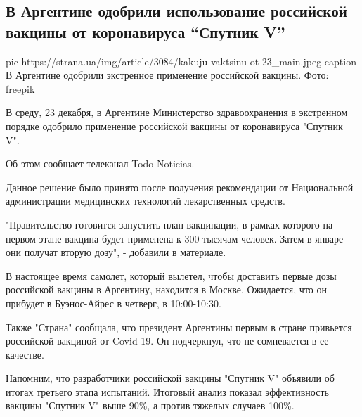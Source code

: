  
 
 
 
 
 
\subsection{В Аргентине одобрили использование российской вакцины от коронавируса \enquote{Спутник V}}
\label{sec:23_12_2020.news.ua.strana.1.argentina_sputnik_v}


\ifcmt
  pic https://strana.ua/img/article/3084/kakuju-vaktsinu-ot-23_main.jpeg
	caption В Аргентине одобрили экстренное применение российской вакцины. Фото: freepik 
\fi

В среду, 23 декабря, в Аргентине Министерство здравоохранения в экстренном
порядке одобрило применение российской вакцины от коронавируса "Спутник V".

Об этом сообщает телеканал Todo Noticias.

Данное решение было принято после получения рекомендации от Национальной
администрации медицинских технологий лекарственных средств.

"Правительство готовится запустить план вакцинации, в рамках которого на первом
этапе вакцина будет применена к 300 тысячам человек. Затем в январе они получат
вторую дозу", - добавили в материале.

В настоящее время самолет, который вылетел, чтобы доставить первые дозы
российской вакцины в Аргентину, находится в Москве. Ожидается, что он прибудет
в Буэнос-Айрес в четверг, в 10:00-10:30.

Также "Страна" сообщала, что президент Аргентины первым в стране привьется
российской вакциной от Covid-19. Он подчеркнул, что не сомневается в ее
качестве.

Напомним, что разработчики российской вакцины "Спутник V" объявили об итогах
третьего этапа испытаний. Итоговый анализ показал эффективность вакцины
"Спутник V" выше 90\%, а против тяжелых случаев 100\%.
